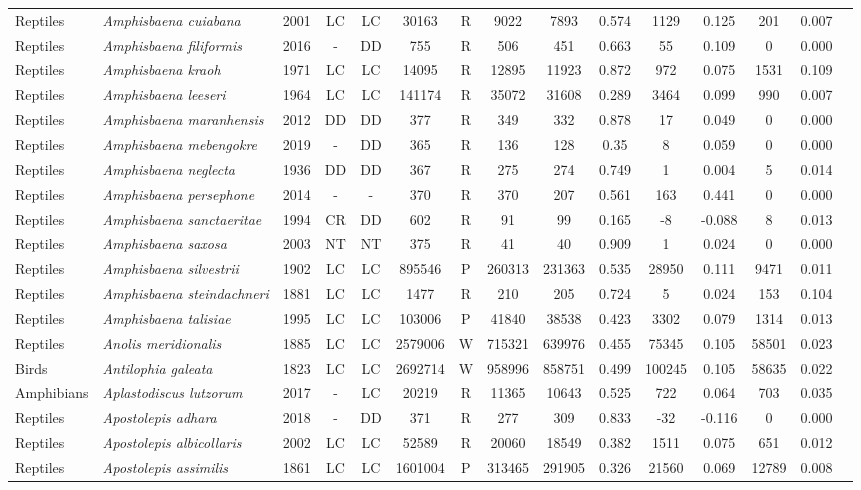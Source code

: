 \documentclass[12pt,openright,oneside,a4paper,english]{abntex2}
\begin{document}
\begin{landscape}
\begin{longtable}{llccccccccccccc}
		Reptiles&\textit{Amphisbaena cuiabana}&2001&LC&LC&30163&R&9022&7893&0.574&1129&0.125&201&0.007\\
		Reptiles&\textit{Amphisbaena filiformis}&2016&-&DD&755&R&506&451&0.663&55&0.109&0&0.000\\
		Reptiles&\textit{Amphisbaena kraoh}&1971&LC&LC&14095&R&12895&11923&0.872&972&0.075&1531&0.109\\
		Reptiles&\textit{Amphisbaena leeseri}&1964&LC&LC&141174&R&35072&31608&0.289&3464&0.099&990&0.007\\
		Reptiles&\textit{Amphisbaena maranhensis}&2012&DD&DD&377&R&349&332&0.878&17&0.049&0&0.000\\
		Reptiles&\textit{Amphisbaena mebengokre}&2019&-&DD&365&R&136&128&0.35&8&0.059&0&0.000\\
		Reptiles&\textit{Amphisbaena neglecta}&1936&DD&DD&367&R&275&274&0.749&1&0.004&5&0.014\\
		Reptiles&\textit{Amphisbaena persephone}&2014&-&-&370&R&370&207&0.561&163&0.441&0&0.000\\
		Reptiles&\textit{Amphisbaena sanctaeritae}&1994&CR&DD&602&R&91&99&0.165&-8&-0.088&8&0.013\\
		Reptiles&\textit{Amphisbaena saxosa}&2003&NT&NT&375&R&41&40&0.909&1&0.024&0&0.000\\
		Reptiles&\textit{Amphisbaena silvestrii}&1902&LC&LC&895546&P&260313&231363&0.535&28950&0.111&9471&0.011\\
		Reptiles&\textit{Amphisbaena steindachneri}&1881&LC&LC&1477&R&210&205&0.724&5&0.024&153&0.104\\
		Reptiles&\textit{Amphisbaena talisiae}&1995&LC&LC&103006&P&41840&38538&0.423&3302&0.079&1314&0.013\\
		Reptiles&\textit{Anolis meridionalis}&1885&LC&LC&2579006&W&715321&639976&0.455&75345&0.105&58501&0.023\\
		Birds&\textit{Antilophia galeata}&1823&LC&LC&2692714&W&958996&858751&0.499&100245&0.105&58635&0.022\\
		Amphibians&\textit{Aplastodiscus lutzorum}&2017&-&LC&20219&R&11365&10643&0.525&722&0.064&703&0.035\\
		Reptiles&\textit{Apostolepis adhara}&2018&-&DD&371&R&277&309&0.833&-32&-0.116&0&0.000\\
		Reptiles&\textit{Apostolepis albicollaris}&2002&LC&LC&52589&R&20060&18549&0.382&1511&0.075&651&0.012\\
		Reptiles&\textit{Apostolepis assimilis}&1861&LC&LC&1601004&P&313465&291905&0.326&21560&0.069&12789&0.008\\

\end{longtable}
\end{landscape}
\end{document}
